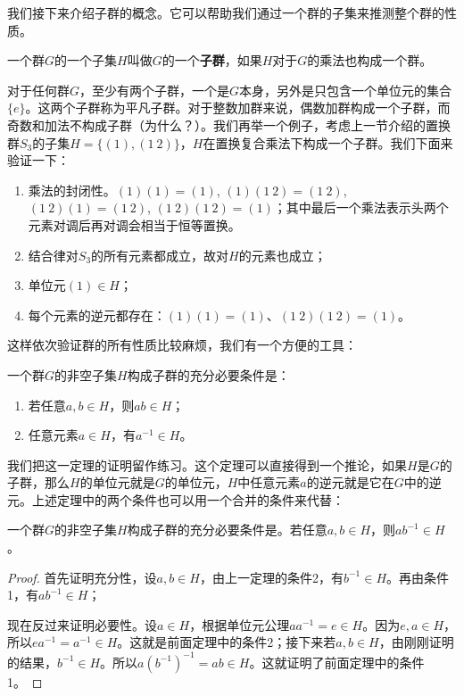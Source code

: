 \documentclass[b5paper]{ctexart}
\begin{document}
我们接下来介绍子群的概念。它可以帮助我们通过一个群的子集来推测整个群的性质。

\begin{definition}
一个群$G$的一个子集$H$叫做$G$的一个\textbf{子群}，如果$H$对于$G$的乘法也构成一个群。
\end{definition}

对于任何群$G$，至少有两个子群，一个是$G$本身，另外是只包含一个单位元的集合$\{e\}$。这两个子群称为平凡子群。对于整数加群来说，偶数加群构成一个子群，而奇数和加法不构成子群（为什么？）。我们再举一个例子，考虑上一节介绍的置换群$S_3$的子集$H = \{(1), (1\ 2)\}$，$H$在置换复合乘法下构成一个子群。我们下面来验证一下：

\begin{enumerate}
\item 乘法的封闭性。$(1)(1) = (1)$, $(1)(1\ 2) = (1\ 2)$, $(1\ 2)(1) = (1\ 2)$, $(1\ 2) (1\ 2) = (1)$；其中最后一个乘法表示头两个元素对调后再对调会相当于恒等置换。
\item 结合律对$S_3$的所有元素都成立，故对$H$的元素也成立；
\item 单位元$(1) \in H$；
\item 每个元素的逆元都存在：$(1)(1) = (1)$、$(1\ 2) (1\ 2) = (1)$。
\end{enumerate}

这样依次验证群的所有性质比较麻烦，我们有一个方便的工具：

\begin{theorem}
一个群$G$的非空子集$H$构成子群的充分必要条件是：
\begin{enumerate}
\item 若任意$a, b \in H$，则$ab \in H$；
\item 任意元素$a \in H$，有$a^{-1} \in H$。
\end{enumerate}
\label{theorem:subgroup}
\end{theorem}

我们把这一定理的证明留作练习。这个定理可以直接得到一个推论，如果$H$是$G$的子群，那么$H$的单位元就是$G$的单位元，$H$中任意元素$a$的逆元就是它在$G$中的逆元。上述定理中的两个条件也可以用一个合并的条件来代替：

\begin{theorem}
一个群$G$的非空子集$H$构成子群的充分必要条件是。若任意$a, b \in H$，则$ab^{-1} \in H$。
\label{theorem:subgroup-2}
\end{theorem}

\begin{proof}
首先证明充分性，设$a, b \in H$，由上一定理的条件2，有$b^{-1} \in H$。再由条件1，有$ab^{-1} \in H$；

现在反过来证明必要性。设$a \in H$，根据单位元公理$aa^{-1} = e \in H$。因为$e, a \in H$，所以$ea^{-1} = a^{-1} \in H$。这就是前面定理中的条件2；接下来若$a, b \in H$，由刚刚证明的结果，$b^{-1} \in H$。所以$a(b^{-1})^{-1} = ab \in H$。这就证明了前面定理中的条件1。
\end{proof}
\end{document}
